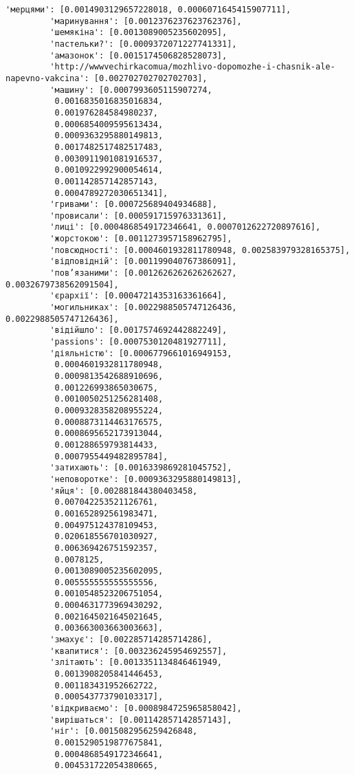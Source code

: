 \documentclass[11pt]{article}
\begin{document}
\begin{Verbatim}[commandchars=\\\{\}]
         'мерцями': [0.0014903129657228018, 0.0006071645415907711],
         'маринування': [0.0012376237623762376],
         'шемякіна': [0.0013089005235602095],
         'пастельки?': [0.0009372071227741331],
         'амазонок': [0.0015174506828528073],
         'http://wwwvechirkacomua/mozhlivo-dopomozhe-i-chasnik-ale-napevno-vakcina': [0.002702702702702703],
         'машину': [0.0007993605115907274,
          0.0016835016835016834,
          0.001976284584980237,
          0.0006854009595613434,
          0.0009363295880149813,
          0.0017482517482517483,
          0.0030911901081916537,
          0.0010922992900054614,
          0.001142857142857143,
          0.0004789272030651341],
         'гривами': [0.000725689404934688],
         'провисали': [0.000591715976331361],
         'лиці': [0.0004868549172346641, 0.0007012622720897616],
         'жорстокою': [0.0011273957158962795],
         'повсюдності': [0.0004601932811780948, 0.002583979328165375],
         'відповідній': [0.001199040767386091],
         'пов’язаними': [0.0012626262626262627, 0.0032679738562091504],
         'єрархії': [0.00047214353163361664],
         'могильниках': [0.0022988505747126436, 0.0022988505747126436],
         'відійшло': [0.0017574692442882249],
         'passions': [0.0007530120481927711],
         'діяльністю': [0.0006779661016949153,
          0.0004601932811780948,
          0.0009813542688910696,
          0.001226993865030675,
          0.0010050251256281408,
          0.0009328358208955224,
          0.0008873114463176575,
          0.0008695652173913044,
          0.001288659793814433,
          0.0007955449482895784],
         'затихають': [0.0016339869281045752],
         'неповоротке': [0.0009363295880149813],
         'яйця': [0.002881844380403458,
          0.007042253521126761,
          0.001652892561983471,
          0.004975124378109453,
          0.020618556701030927,
          0.006369426751592357,
          0.0078125,
          0.0013089005235602095,
          0.005555555555555556,
          0.0010548523206751054,
          0.0004631773969430292,
          0.0021645021645021645,
          0.003663003663003663],
         'змахує': [0.002285714285714286],
         'квапитися': [0.003236245954692557],
         'злітають': [0.0013351134846461949,
          0.0013908205841446453,
          0.001183431952662722,
          0.000543773790103317],
         'відкриваємо': [0.0008984725965858042],
         'вирішаться': [0.001142857142857143],
         'ніг': [0.0015082956259426848,
          0.0015290519877675841,
          0.0004868549172346641,
          0.004531722054380665,

\end{Verbatim}
\end{document}

